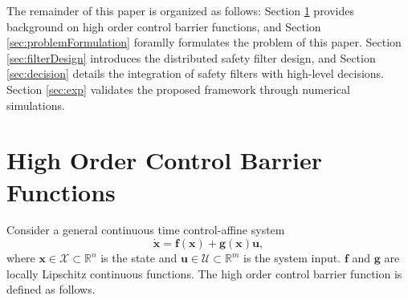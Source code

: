 \documentclass{ifacconf}
\begin{document}
\par The remainder of this paper is organized as follows: Section \ref{sec:preliminariy} provides background on high order control barrier functions, and Section \ref{sec:problemFormulation} foramlly formulates the problem of this paper.
Section \ref{sec:filterDesign} introduces the distributed safety filter design, and Section \ref{sec:decision} details the integration of safety filters with high-level decisions.
Section \ref{sec:exp} validates the proposed framework through numerical simulations.


\section{High Order Control Barrier Functions}\label{sec:preliminariy}
Consider a general continuous time control-affine system
\begin{equation} \label{eqn:system}
  \dot{\boldsymbol{x}} = \boldsymbol{f}(\boldsymbol{x}) + \boldsymbol{g}(\boldsymbol{x}) \boldsymbol{u} ,
\end{equation}
where $\boldsymbol{x} \in \mathcal{X} \subset \mathbb{R}^n$ is the state and $\boldsymbol{u} \in \mathcal{U} \subset \mathbb{R}^m$ is the system input. $\boldsymbol{f}$ and $\boldsymbol{g}$ are locally Lipschitz continuous functions. The high order control barrier function is defined as follows.
\end{document}
